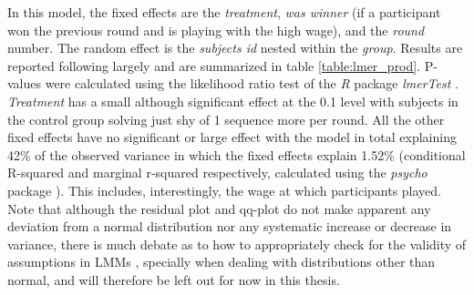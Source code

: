 In this model, the fixed effects are the \textit{treatment}, \textit{was winner} (if a participant won the previous round and is playing with the high wage), and the \textit{round} number. The random effect is the \textit{subjects id} nested within the \textit{group}. Results are reported following largely \cite{barr2013} and are summarized in table \ref{table:lmer_prod}. P-values were calculated using the likelihood ratio test of the \textit{R} package \textit{lmerTest} \citep{kuznetsova2017}.\\

\textit{Treatment} has a small although significant effect at the 0.1 level with subjects in the control group solving just shy of 1 sequence more per round. All the other fixed effects have no significant or large effect with the model in total explaining 42\% of the observed variance in which the fixed effects explain 1.52\% (conditional R-squared and marginal r-squared respectively, calculated using the \textit{psycho} package \citep{makowski2018}). This includes, interestingly, the wage at which participants played.\\

Note that although the residual plot and qq-plot do not make apparent any deviation from a normal distribution nor any systematic increase or decrease in variance, there is much debate as to how to appropriately check for the validity of assumptions in LMMs  \citep{loy2017}, specially when dealing with distributions other than normal, and will therefore be left out for now in this thesis.\\

